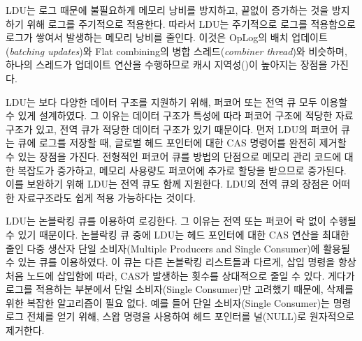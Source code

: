 LDU는 로그 때문에 불필요하게 메모리 낭비를 방지하고, 끝없이 증가하는 것을 방지하기 위해 
로그를 주기적으로 적용한다. 
따라서 LDU는 주기적으로 로그를 적용함으로 로그가 쌓여서 발생하는 메모리 낭비를 줄인다. 
이것은 OpLog의 배치 업데이트(\textit{batching updates})와 Flat combining의 병합
스레드(\textit{combiner thread})와 비슷하며, 하나의 스레드가 업데이트 연산을 수행하므로 
캐시 지역성()이 높아지는 장점을 가진다. 

LDU는 보다 다양한 데이터 구조를 지원하기 위해, 퍼코어 또는 전역 큐 모두 이용할 수 있게
설계하였다.
그 이유는 데이터 구조가 특성에 따라 퍼코어 구조에 적당한 자료구조가 있고,
전역 큐가 적당한 데이터 구조가 있기 때문이다.
먼저 LDU의 퍼코어 큐는 큐에 로그를 저장할 때, 글로벌 헤드 포인터에 대한 CAS
명령어를 완전히 제거할 수 있는 장점을 가진다.
전형적인 퍼코어 큐를 방법의 단점으로 메모리 관리 코드에 대한 복잡도가 증가하고, 
메모리 사용량도 퍼코어에 추가로 할당을 받으므로 증가된다.
이를 보완하기 위해 LDU는 전역 큐도 함께 지원한다.
LDU의 전역 큐의 장점은 어떠한 자료구조라도 쉽게 적용 가능하다는 것이다. 

LDU는 논블락킹 큐를 이용하여 로깅한다. 
그 이유는 전역 또는 퍼코어 락 없이 수행될 수 있기 때문이다. 
논블락킹 큐 중에 LDU는 헤드 포인터에 대한 CAS 연산을 최대한 줄인 다중 생산자 
단일 소비자(Multiple Producers and Single Consumer)에 활용될 수 있는 큐를 이용하였다.
이 큐는 다른 논블락킹 리스트들과 다르게, 삽입 명령을 항상 처음 노드에 삽입함에
따라, CAS가 발생하는 횟수를 상대적으로 줄일 수 있다.
게다가 로그를 적용하는 부분에서 단일 소비자(Single Consumer)만 고려했기 때문에, 
삭제를 위한 복잡한 알고리즘이 필요 없다. 
예를 들어 단일 소비자(Single Consumer)는 명령 로그 전체를 얻기 위해, 스왑 명령을 사용하여 
헤드 포인터를 널(NULL)로 원자적으로 제거한다.

